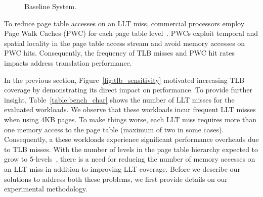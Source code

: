 

\begin{figure}[t]
\vspace{0. in}
\centering
\centerline{}

        \caption{\small Baseline System. \normalsize}

\label{fig:config}
\vspace{-.2 in}
\end{figure}


To reduce page table accesses on an LLT miss, commercial processors
employ Page Walk Caches (PWC) for each page table level~\cite{SkipPT,
MMUcaches}. PWCs exploit temporal and spatial locality in the page
table access stream and avoid memory accesses on PWC hits.
Consequently, the frequency of TLB misses and PWC hit rates impacts
address translation performance.



In the previous section, Figure~\ref{fig:tlb_sensitivity} motivated
increasing TLB coverage by demonstrating its direct impact on
performance. To provide further insight, Table~\ref{table:bench_char}
shows the number of LLT misses for the evaluated workloads. We observe
that these workloads incur frequent LLT misses when using 4KB pages.
To make things worse, each LLT miss requires more than one memory
access to the page table (maximum of two in some cases). Consequently,
a these workloads experience significant performance overheads due to
TLB misses. With the number of levels in the page table hierarchy
expected to grow to 5-levels~\cite{x86_5level}, there is a need for
reducing the number of memory accesses on an LLT miss in addition to
improving LLT coverage. Before we describe our solutions to address
both these problems, we first provide details on our experimental
methodology.


